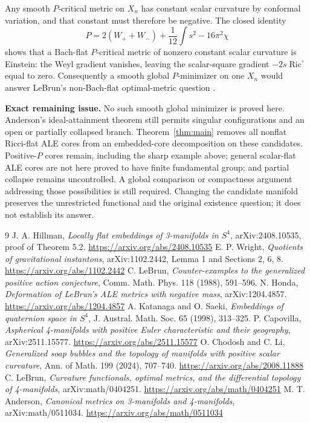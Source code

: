 \documentclass[11pt]{article}
\newcommand{\Ric}{\operatorname{Ric}}
\begin{document}
Any smooth $P$-critical metric on $X_n$ has constant scalar curvature by
conformal variation, and that constant must therefore be negative.
The closed identity
\[
                P=2(W_++W_-)+\frac1{12}\int s^2-16\pi^2\chi
\]
shows that a Bach-flat $P$-critical metric of nonzero constant scalar curvature
is Einstein: the Weyl gradient vanishes, leaving the scalar-square gradient
$-2s\Ric^\circ$ equal to zero. Consequently a smooth global $P$-minimizer on
one $X_n$ would answer LeBrun's non-Bach-flat optimal-metric question
\cite[Section 11]{LeBrun04}.

\medskip\noindent\textbf{Exact remaining issue.}
No such smooth global minimizer is proved here. Anderson's ideal-attainment
theorem \cite[Theorem 4.10 and Remark 4.12]{Anderson} still permits singular
configurations and an open or partially collapsed branch. Theorem~\ref{thm:main}
removes all nonflat Ricci-flat ALE cores from an embedded-core decomposition
on these candidates. Positive-$P$ cores remain, including the sharp example
above; general scalar-flat ALE cores are not here proved to have finite
fundamental group; and partial collapse remains uncontrolled. A global
comparison or compactness argument addressing those possibilities is still
required. Changing the candidate manifold preserves the unrestricted
functional and the original existence question; it does not establish its
answer.

\begin{thebibliography}{9}
 J. A. Hillman, \emph{Locally flat embeddings of 3-manifolds
in $S^4$}, arXiv:2408.10535, proof of Theorem 5.2.
\url{https://arxiv.org/abs/2408.10535}
 E. P. Wright, \emph{Quotients of gravitational instantons},
arXiv:1102.2442, Lemma 1 and Sections 2, 6, 8.
\url{https://arxiv.org/abs/1102.2442}
 C. LeBrun, \emph{Counter-examples to the generalized
positive action conjecture}, Comm. Math. Phys. 118 (1988), 591--596.
 N. Honda, \emph{Deformation of LeBrun's ALE metrics with
negative mass}, arXiv:1204.4857.
\url{https://arxiv.org/abs/1204.4857}
 A. Katanaga and O. Saeki, \emph{Embeddings of quaternion space
in $S^4$}, J. Austral. Math. Soc. 65 (1998), 313--325.
 P. Capovilla, \emph{Aspherical 4-manifolds with positive
Euler characteristic and their geography}, arXiv:2511.15577.
\url{https://arxiv.org/abs/2511.15577}
 O. Chodosh and C. Li, \emph{Generalized soap bubbles and the
topology of manifolds with positive scalar curvature}, Ann. of Math. 199
(2024), 707--740. \url{https://arxiv.org/abs/2008.11888}
 C. LeBrun, \emph{Curvature functionals, optimal metrics,
and the differential topology of 4-manifolds}, arXiv:math/0404251.
\url{https://arxiv.org/abs/math/0404251}
 M. T. Anderson, \emph{Canonical metrics on 3-manifolds
and 4-manifolds}, arXiv:math/0511034.
\url{https://arxiv.org/abs/math/0511034}
\end{thebibliography}
\end{document}

